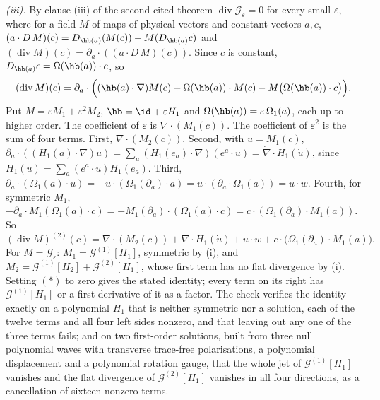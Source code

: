 \emph{(iii).} By clause (iii) of the second cited theorem $\operatorname{div}\mathcal{G}_{\varepsilon} = 0$ for every small $\varepsilon$, where for a field $M$ of maps of physical vectors and constant vectors $a, c$, $(a \cdot D\,M)(c) = D_{\hb(a)}(M(c)) - M(D_{\hb(a)}c)$ and $(\operatorname{div}M)(c) = \partial_{a} \cdot ((a \cdot D\,M)(c))$. Since $c$ is constant, $D_{\hb(a)}c = \Omega(\hb(a)) \cdot c$, so
\[
(\operatorname{div}M)(c) = \partial_{a} \cdot \Bigl((\hb(a) \cdot \nabla)M(c) + \Omega(\hb(a)) \cdot M(c) - M\bigl(\Omega(\hb(a)) \cdot c\bigr)\Bigr) .
\]
Put $M = \varepsilon M_{1} + \varepsilon^{2}M_{2}$, $\hb = \id + \varepsilon H_{1}$ and $\Omega(\hb(a)) = \varepsilon\,\Omega_{1}(a)$, each up to higher order. The coefficient of $\varepsilon$ is $\nabla \cdot (M_{1}(c))$. The coefficient of $\varepsilon^{2}$ is the sum of four terms. First, $\nabla \cdot (M_{2}(c))$. Second, with $u = M_{1}(c)$, $\partial_{a} \cdot ((H_{1}(a) \cdot \nabla)u) = \sum_{a}(H_{1}(e_{a}) \cdot \nabla)(e^{a} \cdot u) = \dot\nabla \cdot H_{1}(\dot u)$, since $H_{1}(u) = \sum_{a}(e^{a} \cdot u)H_{1}(e_{a})$. Third, $\partial_{a} \cdot (\Omega_{1}(a) \cdot u) = -u \cdot (\Omega_{1}(\partial_{a}) \cdot a) = u \cdot (\partial_{a} \cdot \Omega_{1}(a)) = u \cdot w$. Fourth, for symmetric $M_{1}$, $-\partial_{a} \cdot M_{1}(\Omega_{1}(a) \cdot c) = -M_{1}(\partial_{a}) \cdot (\Omega_{1}(a) \cdot c) = c \cdot (\Omega_{1}(\partial_{a}) \cdot M_{1}(a))$. So
\[
(\operatorname{div}M)^{(2)}(c) = \nabla \cdot (M_{2}(c)) + \dot\nabla \cdot H_{1}(\dot u) + u \cdot w + c \cdot \bigl(\Omega_{1}(\partial_{a}) \cdot M_{1}(a)\bigr) . \tag{$*$}
\]
For $M = \mathcal{G}_{\varepsilon}$: $M_{1} = \mathcal{G}^{(1)}[H_{1}]$, symmetric by (i), and $M_{2} = \mathcal{G}^{(1)}[H_{2}] + \mathcal{G}^{(2)}[H_{1}]$, whose first term has no flat divergence by (i). Setting $(*)$ to zero gives the stated identity; every term on its right has $\mathcal{G}^{(1)}[H_{1}]$ or a first derivative of it as a factor. The check verifies the identity exactly on a polynomial $H_{1}$ that is neither symmetric nor a solution, each of the twelve terms and all four left sides nonzero, and that leaving out any one of the three terms fails; and on two first-order solutions, built from three null polynomial waves with transverse trace-free polarisations, a polynomial displacement and a polynomial rotation gauge, that the whole jet of $\mathcal{G}^{(1)}[H_{1}]$ vanishes and the flat divergence of $\mathcal{G}^{(2)}[H_{1}]$ vanishes in all four directions, as a cancellation of sixteen nonzero terms.

